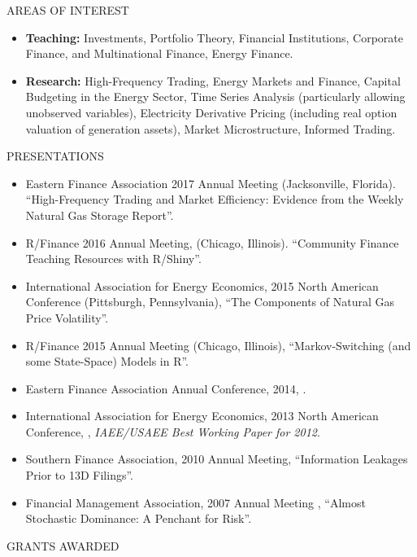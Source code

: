 \documentclass[9pt]{article}
\begin{document}
\vspace{10pt}
AREAS OF INTEREST
\begin{itemize}[noitemsep, nolistsep]
\item {\bf Teaching:} Investments, Portfolio Theory, Financial Institutions, Corporate Finance, and Multinational Finance, Energy Finance.
\item {\bf Research:} High-Frequency Trading, Energy Markets and Finance, Capital Budgeting in the Energy Sector, Time Series Analysis (particularly allowing unobserved variables), Electricity Derivative Pricing (including real option valuation of generation assets), Market Microstructure, Informed Trading.
\end{itemize}
\vspace{10pt}
PRESENTATIONS
\begin{itemize}[noitemsep, nolistsep]
  \item Eastern Finance Association 2017 Annual Meeting (Jacksonville, Florida). ``High-Frequency Trading and Market Efficiency: Evidence from the Weekly Natural Gas Storage Report''.
\item  R/Finance 2016 Annual Meeting, (Chicago, Illinois). ``Community Finance Teaching Resources with R/Shiny''.
\item  International Association for Energy Economics, 2015 North American Conference (Pittsburgh, Pennsylvania), ``The Components of Natural Gas Price Volatility''.
\item  R/Finance 2015 Annual Meeting (Chicago, Illinois), ``Markov-Switching (and some State-Space) Models in R''.
\item Eastern Finance Association Annual Conference, 2014, \href{http://ssrn.com/abstract=2371753}{\color{Blue}{The Switching Relationship between Natural Gas and Crude Oil Prices}}.
\item International Association for Energy Economics, 2013 North American Conference, \href{http://papers.ssrn.com/sol3/papers.cfm?abstract_id=2194215}{\color{Blue}{``The Switching Relationship between Natural Gas and Oil Prices''}}, {\it IAEE/USAEE Best Working Paper for 2012}. 
\item Southern Finance Association, 2010 Annual Meeting, ``Information Leakages Prior to 13D Filings''.
\item Financial Management Association, 2007 Annual Meeting , ``Almost Stochastic Dominance: A Penchant for Risk''.
\end{itemize}
\vspace{10pt}
GRANTS AWARDED
\end{document}
